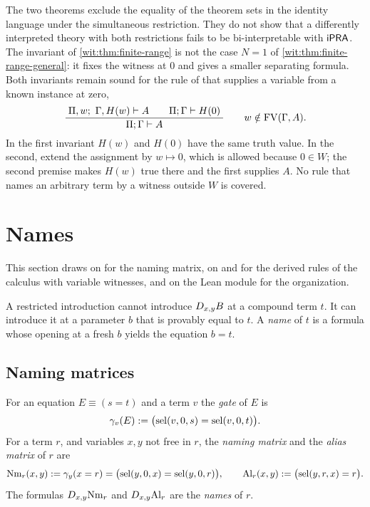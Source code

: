 \begin{remark}
\label{wit:rem:obstruction-scope}
The two theorems exclude the equality of the theorem sets in the identity
language under the simultaneous restriction.  They do not show that a
differently interpreted theory with both restrictions fails to be
bi-interpretable with $\mathsf{iPRA}$.  The invariant of
\cref{wit:thm:finite-range} is not the case $N=1$ of
\cref{wit:thm:finite-range-general}: it fixes the witness at $0$ and gives a
smaller separating formula.  Both invariants remain sound for the rule of
 that supplies a variable from a known
instance at zero,
\[
 \dfrac{\;\Pi,w;\ \Gamma,H(w)\vdash A\qquad\Pi;\Gamma\vdash H(0)\;}{\;\Pi;\Gamma\vdash A\;}\qquad w\notin\operatorname{FV}(\Gamma,A).
\]
In the first invariant $H(w)$ and $H(0)$ have the same truth value.  In the
second, extend the assignment by $w\mapsto 0$, which is allowed because
$0\in W$; the second premise makes $H(w)$ true there and the first supplies
$A$.  No rule that names an arbitrary term by a witness outside $W$ is
covered.
\end{remark}

\section{Names}
\label{wit:sec:names}

This section draws on  for the naming
matrix, on  and  for the derived
rules of the calculus with variable witnesses, and on the Lean module
 for the organization.

A restricted introduction cannot introduce $D_{x,y}B$ at a compound term
$t$.  It can introduce it at a parameter $b$ that is provably equal to $t$.
A \emph{name} of $t$ is a formula whose opening at a fresh $b$ yields the
equation $b=t$.

\subsection{Naming matrices}

\begin{definition}
\label{wit:def:naming}
For an equation $E\equiv(s=t)$ and a term $v$ the \emph{gate} of $E$ is
\[
 \gamma_v(E)\mathrel{:=}\bigl(\operatorname{sel}(v,0,s)=\operatorname{sel}(v,0,t)\bigr).
\]
For a term $r$, and variables $x,y$ not free in $r$, the \emph{naming
matrix} and the \emph{alias matrix} of $r$ are
\[
 \mathrm{Nm}_r(x,y)\mathrel{:=}\gamma_y(x=r)
   =\bigl(\operatorname{sel}(y,0,x)=\operatorname{sel}(y,0,r)\bigr),
 \qquad
 \mathrm{Al}_r(x,y)\mathrel{:=}\bigl(\operatorname{sel}(y,r,x)=r\bigr).
\]
The formulas $D_{x,y}\mathrm{Nm}_r$ and $D_{x,y}\mathrm{Al}_r$ are the
\emph{names} of $r$.
\end{definition}

